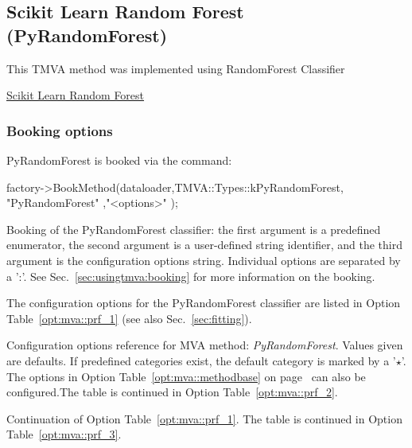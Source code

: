\subsection{Scikit Learn Random Forest (PyRandomForest)}
\label{sec:PyRandomForest}

This TMVA method was implemented using RandomForest Classifier 

\href{http://scikit-learn.org/stable/modules/ensemble.html#forests-of-randomized-trees}{Scikit Learn Random Forest}


\subsubsection{Booking options}

PyRandomForest is booked via the command:
\begin{codeexample}
\begin{tmvacode}
factory->BookMethod(dataloader,TMVA::Types::kPyRandomForest, "PyRandomForest"
,"<options>" );
\end{tmvacode}
\caption[.]{\codeexampleCaptionSize Booking of the PyRandomForest classifier: the first argument is 
		   a predefined enumerator, the second argument is a user-defined 
		   string identifier, and the third argument is the configuration options string.
         Individual options are separated by a ':'. 
         See Sec.~\ref{sec:usingtmva:booking} for more information on the booking.}
\end{codeexample}

The configuration options for the PyRandomForest classifier are listed in Option Table~\ref{opt:mva::prf_1}
(see also Sec.~\ref{sec:fitting}).

\begin{option}[p]

\caption[.]{\optionCaptionSize 
     Configuration options reference for MVA method: {\em PyRandomForest}.
     Values given are defaults. If predefined categories exist, the default category 
     is marked by a '$\star$'. The options in Option Table~\ref{opt:mva::methodbase} on 
     page~\pageref{opt:mva::methodbase} can also be configured.The table
      is continued in Option Table~\ref{opt:mva::prf_2}.  
}
\label{opt:mva::prf_1}
\end{option}

\begin{option}[p]

\caption[.]{\optionCaptionSize 
     Continuation of Option Table~\ref{opt:mva::prf_1}.\newline
     The table is continued in Option Table~\ref{opt:mva::prf_3}.  
}
\label{opt:mva::prf_2}
\end{option}

